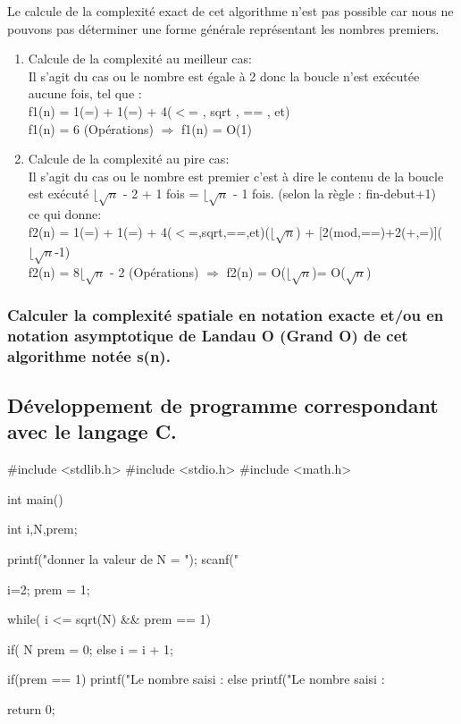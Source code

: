 \documentclass[12pt]{article}
\begin{document}
Le calcule de la complexité exact de cet algorithme n'est pas possible car nous ne pouvons pas déterminer une forme générale représentant les nombres premiers.
 
\begin{enumerate}
	\item Calcule de la complexité au meilleur cas:
	\\
	Il s'agit du cas ou le nombre est égale à 2 donc la boucle n'est exécutée aucune fois, tel que :
	\\
	f1(n) = 1(=) + 1(=) + 4($<$= , sqrt , == , et) 
	\\
	\color{blue}
	f1(n) = 6 (Opérations) $\Rightarrow$ f1(n) = O(1)
	\color{black}
	\\
	\item Calcule de la complexité au pire cas:
	\\
	Il s'agit du cas ou le nombre est premier c'est à dire le contenu de la boucle est exécuté $\lfloor{\sqrt{n}}$ - 2 + 1 fois = $\lfloor{\sqrt{n}}$ - 1 fois.
	(selon la règle : fin-debut+1)
	\\
	ce qui donne:
	\\
	f2(n) = 1(=) + 1(=) + 4($<$=,sqrt,==,et)($\lfloor{\sqrt{n}}$) + [2(mod,==)+2(+,=)]($\lfloor{\sqrt{n}}$-1) 
	\\
	\color{blue}
	f2(n) = 8$\lfloor{\sqrt{n}}$ - 2 (Opérations) $\Rightarrow$ f2(n) = O($\lfloor{\sqrt{n}}$)= O($\sqrt{n}$)
	\color{black}
\end{enumerate}




\subsubsection{Calculer la complexité spatiale en notation exacte et/ou en notation asymptotique de Landau O (Grand O) de  cet  algorithme notée s(n).}



\subsection{Développement de programme correspondant avec le langage C.}


\begin{sql}
#include <stdlib.h>
#include <stdio.h>
#include <math.h>

int main()
{

	int i,N,prem;


	printf("donner la valeur de N = ");
	scanf("%

	i=2;
	prem = 1;

	while( i <= sqrt(N) && prem == 1){

		if( N%
			prem = 0;
		else
			i = i + 1;
	}

	if(prem == 1)
    {
        printf("Le nombre saisi : %
    }
	else{
        printf("Le nombre saisi : %
	}


return 0;

}

\end{sql}
\end{document}
